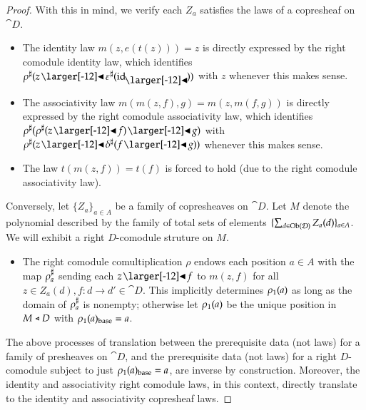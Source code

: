 \documentclass{amsart}
\begin{document}
\begin{proof}
  With this in mind, we verify each $Z_a$ satisfies the laws of a
  copresheaf on $\cat{D}$.
  \begin{itemize}
  \item The identity law $m(z, e(t(z))) = z$ is directly expressed by
    the right comodule identity law, which identifies
    ${\anydirmapof{\rho}{z \subd \anydirmapof{\varepsilon}{\idsubd}}}$
    with $z$ whenever this makes sense.
  \item The associativity law $m(m(z, f), g) = m(z, m(f, g))$ is
    directly expressed by the right comodule associativity law, which
    identifies
    ${\anydirmapof{\rho}{\anydirmapof{\rho}{z \subd f} \subd g}}$ with
    ${\anydirmapof{\rho}{z \subd \anydirmapof{\delta}{f \subd g}}}$ whenever this makes sense.
  \item The law $t(m(z, f)) = t(f)$ is forced to hold (due to the
    right comodule associativity law).
  \end{itemize}

  Conversely, let $\{Z_a\}_{a \in A}$ be a family of copresheaves on
  $\cat{D}$. Let $M$ denote the polynomial described by the family of
  total sets of elements
  $\{\sum_{d \in \operatorname{Ob}(\mathcal{D})}Z_a(d)\}_{a \in A}$. We will exhibit a right
  $D$-comodule struture on $M$.
  \begin{itemize}
  \item The right comodule comultiplication $\rho$ endows each position $a \in A$ with
    the map ${\rho}^\sharp_{a}$ sending each $z \subd f$ to $m(z, f)$ for
    all $z \in Z_a(d), f: d \to d' \in \cat{D}$. This implicitly
    determines ${\rho}_1(a)$ as long as the domain of ${\rho}^\sharp_{a}$ is
    nonempty; otherwise let ${\rho}_1(a)$ be the unique position in
    $M \mathrel{\triangleleft} D$ with ${\rho}_1(a)_{\mathrm{base}} = a$.
  \end{itemize}

  The above processes of translation between the prerequisite data
  (not laws) for a family of presheaves on $\cat{D}$, and the
  prerequisite data (not laws) for a right $D$-comodule subject to
  just ${\rho}_1(a)_{\mathrm{base}} = a$, are inverse by
  construction. Moreover, the identity and associativity right
  comodule laws, in this context, directly translate to the identity
  and associativity copresheaf laws.
\end{proof}
\end{document}
